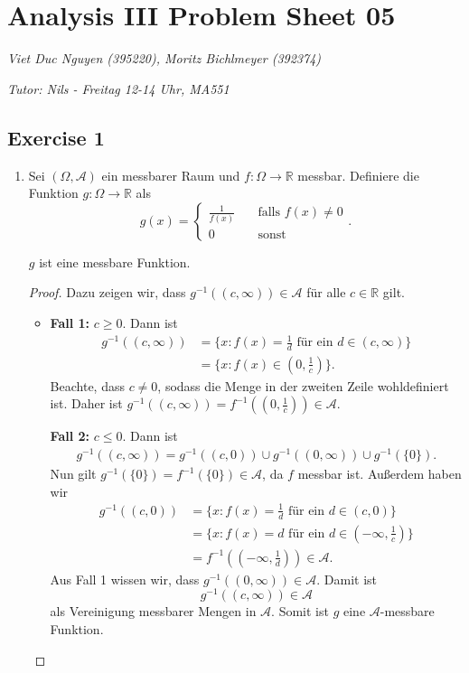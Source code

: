 \documentclass[a4paper]{article}
\begin{document}
\section*{Analysis III Problem Sheet 05}
\textit{Viet Duc Nguyen (395220), Moritz Bichlmeyer (392374)}

\noindent\textit{Tutor: Nils - Freitag 12-14 Uhr, MA551}

\subsection*{Exercise 1}

\begin{enumerate}[label=(\roman*)]
\item Sei $(\Omega, \mathcal A)$ ein messbarer Raum und $f: \Omega \to \mathbb R$ messbar. Definiere die Funktion $g: \Omega \to \mathbb R$ als
\[
	g(x) = \begin{cases}
		\frac{1}{f(x)} \quad &\text{falls $f(x) \neq 0$} \\
		0 & \text{sonst}
	\end{cases}.
\]
\begin{issue}{}{}
	$g$ ist eine messbare Funktion.
\end{issue}
\begin{proof}
Dazu zeigen wir, dass $g^{-1}((c, \infty)) \in \mathcal A$ für alle $c \in \mathbb R$ gilt.
\begin{itemize}
\item \textbf{Fall 1:} $c \geq 0$. Dann ist 
\begin{align*}
g^{-1}((c, \infty)) &= \{ x: f(x) = \frac{1}{d} \text{ für ein $d \in (c,\infty)$} \} \\
&= \{ x: f(x) \in (0, \frac{1}{c}) \}.
\end{align*}
Beachte, dass $c \neq 0$, sodass die Menge in der zweiten Zeile wohldefiniert ist. Daher ist $g^{-1}((c, \infty)) = f^{-1}((0, \frac{1}{c})) \in \mathcal A$.

\textbf{Fall 2:} $c \leq 0$. Dann ist 
\begin{align*}
g^{-1}((c, \infty)) = g^{-1}((c, 0)) \cup g^{-1}((0, \infty)) \cup g^{-1}(\{0\}).
\end{align*}
Nun gilt $ g^{-1}(\{0\}) = f^{-1}(\{ 0 \}) \in \mathcal A$, da $f$ messbar ist. Außerdem haben wir
\begin{align*}
 g^{-1}((c, 0)) &=  \{ x: f(x) = \frac{1}{d} \text{ für ein $d \in (c,0)$} \} \\
 &=  \{ x: f(x) = d \text{ für ein $d \in (-\infty, \frac{1}{c})$} \} \\
 &= f^{-1}((-\infty, \frac{1}{d})) \in \mathcal A.
\end{align*}
Aus Fall 1 wissen wir, dass $ g^{-1}((0, \infty)) \in \mathcal A$. Damit ist $$g^{-1}((c, \infty)) \in \mathcal A$$ als Vereinigung messbarer Mengen in $\mathcal A$. Somit ist $g$ eine $\mathcal A$-messbare Funktion.
\end{itemize}
\end{proof}


\end{enumerate}
\end{document}
